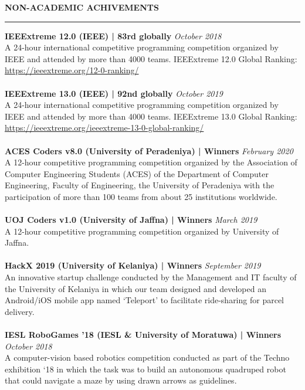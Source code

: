 \documentclass{article}
\newenvironment{rSection}[1]{
    \sectionskip
    \MakeUppercase{\bf #1} 
    \sectionlineskip
    \hrule
    \begin{list}{}{ 
        \setlength{\leftmargin}{1.5em} 
    }
    \item[]
}{
    \end{list}
}
\def\sectionskip{\medskip}
\def\sectionlineskip{\medskip}
\begin{document}
\begin{rSection}{Non-Academic Achivements}
{\bf IEEExtreme 12.0 (IEEE) |  83rd globally}                                   \hfill {\em October 2018} 
\\A 24-hour international competitive programming competition organized by IEEE and attended by more than 4000 teams. IEEExtreme 12.0 Global Ranking: \url{https://ieeextreme.org/12-0-ranking/} \\ \\
{\bf IEEExtreme 13.0 (IEEE) | 92nd globally}                                    \hfill {\em October 2019} 
\\A 24-hour international competitive programming competition organized by IEEE and attended by more than 4000 teams. IEEExtreme 13.0 Global Ranking: \url{https://ieeextreme.org/ieeextreme-13-0-global-ranking/} \\ \\
{\bf ACES Coders v8.0 (University of Peradeniya) | Winners}                     \hfill {\em February 2020} 
\\A 12-hour competitive programming competition organized by the Association of Computer Engineering Students (ACES) of the Department of Computer Engineering, Faculty of Engineering, the University of Peradeniya with the participation of more than 100 teams from about 25 institutions worldwide.\\ \\
{\bf UOJ Coders v1.0 (University of Jaffna) | Winners}                          \hfill {\em March 2019} 
\\A 12-hour competitive programming competition organized by University of Jaffna.\\ \\
{\bf HackX 2019 (University of Kelaniya) | Winners}                             \hfill {\em September 2019} 
\\An innovative startup challenge conducted by the Management and IT faculty of the University of Kelaniya in which our team designed and developed an Android/iOS mobile app named `Teleport' to facilitate ride-sharing for parcel delivery.\\ \\
{\bf IESL RoboGames '18 (IESL \& University of Moratuwa) | Winners}             \hfill {\em October 2018} 
\\A computer-vision based robotics competition conducted as part of the Techno exhibition `18 in which the task was to build an autonomous quadruped robot that could navigate a maze by using drawn arrows as guidelines.\\ \\

\end{rSection}
\end{document}
